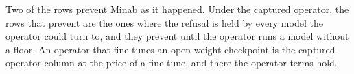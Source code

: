 Two of the rows prevent Minab as it happened. Under the captured operator, the rows that prevent are the ones where the refusal is held by every model the operator could turn to, and they prevent until the operator runs a model without a floor. An operator that fine-tunes an open-weight checkpoint is the captured-operator column at the price of a fine-tune, and there the operator terms hold.
